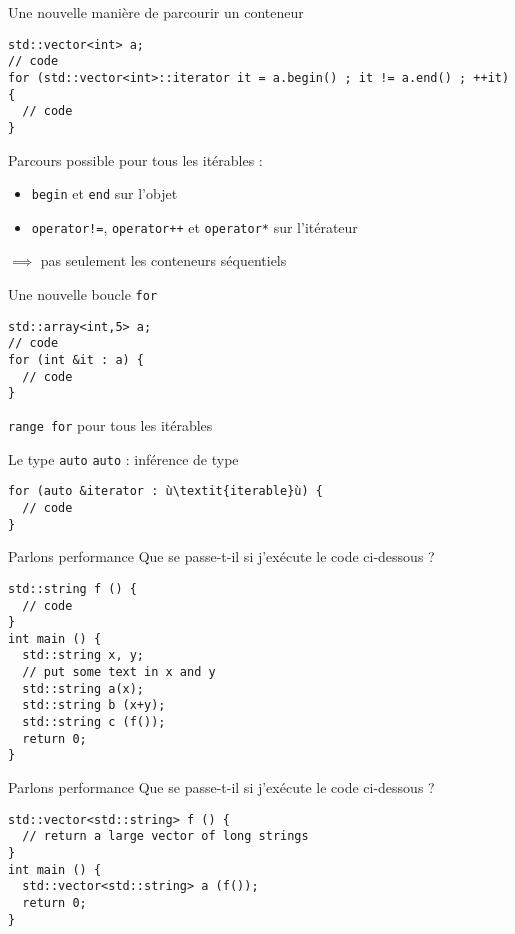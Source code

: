 \begin{frame}[fragile]{Une nouvelle manière de parcourir un conteneur}
   \begin{lstlisting}
std::vector<int> a;
// code
for (std::vector<int>::iterator it = a.begin() ; it != a.end() ; ++it) {
  // code
}
  \end{lstlisting}
  Parcours possible pour tous les itérables :
  \begin{itemize}
  \item \texttt{begin} et \texttt{end} sur l'objet
  \item \texttt{operator!=}, \texttt{operator++} et \texttt{operator*} sur l'itérateur
  \end{itemize}
  $\implies$ pas seulement les conteneurs séquentiels
\end{frame}

\begin{frame}[fragile]{Une nouvelle boucle \texttt{for}}
  \begin{lstlisting}
std::array<int,5> a;
// code
for (int &it : a) {
  // code
}
  \end{lstlisting}
  \texttt{range for} pour tous les itérables
\end{frame}

\begin{frame}[fragile]{Le type \texttt{auto}}
  \texttt{auto} : inférence de type  
  \begin{lstlisting}[escapechar=ù]
for (auto &iterator : ù\textit{iterable}ù) {
  // code
}
  \end{lstlisting}
\end{frame}

\begin{frame}[fragile]{Parlons performance}
  Que se passe-t-il si j'exécute le code ci-dessous ? 
  \begin{lstlisting}
std::string f () {
  // code
}
int main () {
  std::string x, y;
  // put some text in x and y
  std::string a(x);
  std::string b (x+y);
  std::string c (f());
  return 0;
}
  \end{lstlisting}
\end{frame}

\begin{frame}[fragile]{Parlons performance}
  Que se passe-t-il si j'exécute le code ci-dessous ?  
  \begin{lstlisting}
std::vector<std::string> f () {
  // return a large vector of long strings
}
int main () {
  std::vector<std::string> a (f());
  return 0;
}
  \end{lstlisting}
\end{frame}

